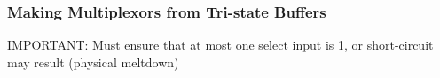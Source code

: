 


\begin{frame}\frametitle{Making Multiplexors from Tri-state Buffers}


\begin{figure}[H]
\centering
\end{figure}
IMPORTANT: Must ensure that at most one select input is 1, or
		short-circuit may result (physical meltdown)\\

\end{frame}





